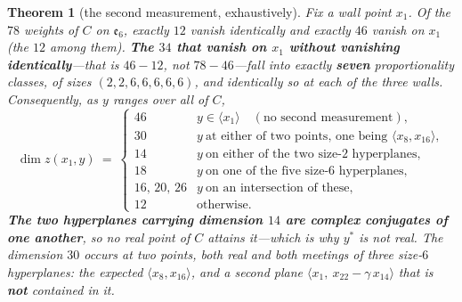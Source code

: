 \documentclass[11pt,reqno]{amsart}
\theoremstyle{plain}
\newtheorem{theorem}{Theorem}[section]
\theoremstyle{definition}
\theoremstyle{remark}
\newcommand{\ee}{\mathfrak{e}}
\begin{document}
\begin{theorem}[the second measurement, exhaustively]\label{thm:smtfull}
Fix a wall point $x_1$. Of the $78$ weights of $C$ on $\ee_6$, exactly $12$ vanish
identically and exactly $46$ vanish on $x_1$ (the $12$ among them). \textbf{The $34$
that vanish on $x_1$ without vanishing identically}---that is $46-12$, not
$78-46$---fall into exactly \textbf{seven}
proportionality classes, of sizes $(2,2,6,6,6,6,6)$, and identically so at each of the
three walls. Consequently, as $y$ ranges over \emph{all} of $C$,
\[
  \dim z(x_1,y)\ =\
  \begin{cases}
    46 & y\in\langle x_1\rangle\quad(\text{no second measurement}),\\
    30 & y\ \text{at either of two points, one being }\langle x_8,x_{16}\rangle,\\
    14 & y\ \text{on either of the two size-$2$ hyperplanes},\\
    18 & y\ \text{on one of the five size-$6$ hyperplanes},\\
    16,\,20,\,26 & y\ \text{on an intersection of these},\\
    12 & \text{otherwise.}
  \end{cases}
\]
\textbf{The two hyperplanes carrying dimension $14$ are complex conjugates of one
another}, so no real point of $C$ attains it---which is why $y^*$ is not real. The
dimension $30$ occurs at \emph{two} points, both real and both meetings of three
size-$6$ hyperplanes: the expected $\langle x_8,x_{16}\rangle$, and a second plane
$\langle x_1,\ x_{22}-\gamma\,x_{14}\rangle$ that is \textbf{not} contained in it.
\end{theorem}
\end{document}

